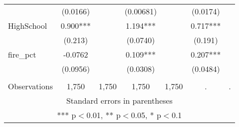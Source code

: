 \begin{tabular}{lcccccc}
 & (0.0166) &  & (0.00681) &  & (0.0174) &  \\
HighSchool & 0.900*** &  & 1.194*** &  & 0.717*** &  \\
 & (0.213) &  & (0.0740) &  & (0.191) &  \\
fire\_pct & -0.0762 &  & 0.109*** &  & 0.207*** &  \\
 & (0.0956) &  & (0.0308) &  & (0.0484) &  \\
 &  &  &  &  &  &  \\
 Observations & 1,750 & 1,750 & 1,750 & 1,750 & . & . \\ \hline
\multicolumn{7}{c}{ Standard errors in parentheses} \\
\multicolumn{7}{c}{ *** p$<$0.01, ** p$<$0.05, * p$<$0.1} \\
\end{tabular}
